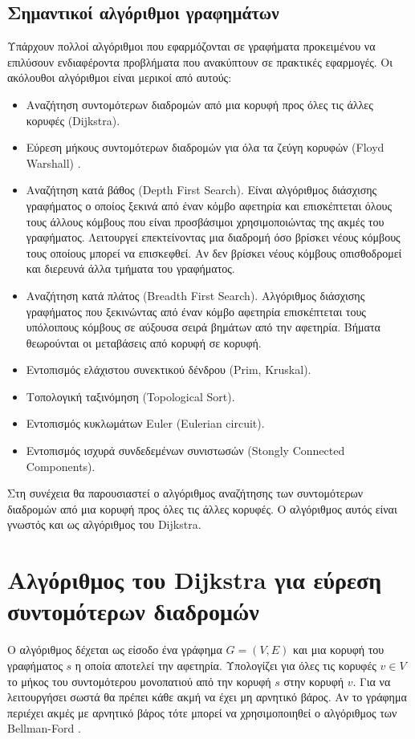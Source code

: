 \subsection{Σημαντικοί αλγόριθμοι γραφημάτων}
Υπάρχουν πολλοί αλγόριθμοι που εφαρμόζονται σε γραφήματα προκειμένου να επιλύσουν ενδιαφέροντα προβλήματα που ανακύπτουν σε πρακτικές εφαρμογές. Οι ακόλουθοι αλγόριθμοι είναι μερικοί από αυτούς:
\begin{itemize}[noitemsep]
	\item Αναζήτηση συντομότερων διαδρομών από μια κορυφή προς όλες τις άλλες κορυφές (Dijkstra).
	\item Εύρεση μήκους συντομότερων διαδρομών για όλα τα ζεύγη κορυφών (Floyd Warshall) \cite{pa_floyd_warshall}.
	\item Αναζήτηση κατά βάθος (Depth First Search). Είναι αλγόριθμος διάσχισης γραφήματος ο οποίος ξεκινά από έναν κόμβο αφετηρία και επισκέπτεται όλους τους άλλους κόμβους που είναι προσβάσιμοι χρησιμοποιώντας της ακμές του γραφήματος. Λειτουργεί επεκτείνοντας μια διαδρομή όσο βρίσκει νέους κόμβους τους οποίους μπορεί να επισκεφθεί. Αν δεν βρίσκει νέους κόμβους οπισθοδρομεί και διερευνά άλλα τμήματα του γραφήματος.
	\item Αναζήτηση κατά πλάτος (Breadth First Search). Αλγόριθμος διάσχισης γραφήματος που ξεκινώντας από έναν κόμβο αφετηρία επισκέπτεται τους υπόλοιπους κόμβους σε αύξουσα σειρά βημάτων από την αφετηρία. Βήματα θεωρούνται οι μεταβάσεις από κορυφή σε κορυφή.
	\item Εντοπισμός ελάχιστου συνεκτικού δένδρου (Prim, Kruskal).
	\item Τοπολογική ταξινόμηση (Topological Sort).
	\item Εντοπισμός κυκλωμάτων Euler (Eulerian circuit).
	\item Εντοπισμός ισχυρά συνδεδεμένων συνιστωσών (Stongly Connected Components).
\end{itemize} 

Στη συνέχεια θα παρουσιαστεί ο αλγόριθμος αναζήτησης των συντομότερων διαδρομών από μια κορυφή προς όλες τις άλλες κορυφές. Ο αλγόριθμος αυτός είναι γνωστός και ως αλγόριθμος του Dijkstra.
 
\section{Αλγόριθμος του Dijkstra για εύρεση συντομότερων διαδρομών}
Ο αλγόριθμος δέχεται ως είσοδο ένα γράφημα $G=(V,E)$ και μια κορυφή του γραφήματος $s$ η οποία αποτελεί την αφετηρία. Υπολογίζει για όλες τις κορυφές $v \in V$ το μήκος του συντομότερου μονοπατιού από την κορυφή $s$ στην κορυφή $v$. Για να λειτουργήσει σωστά θα πρέπει κάθε ακμή να έχει μη αρνητικό βάρος. Αν το γράφημα περιέχει ακμές με αρνητικό βάρος τότε μπορεί να χρησιμοποιηθεί ο αλγόριθμος των Bellman-Ford \cite{brilliant_bellman_ford}.

